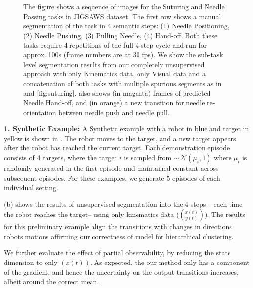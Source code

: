 \begin{figure}[!ht]
	\caption{ The figure shows a sequence of images for the Suturing and Needle Passing tasks in JIGSAWS dataset\cite{gao2014jigsaws}.
The first row shows a manual segmentation of the task in 4 semantic steps: (1) Needle Positioning, (2) Needle Pushing, (3) Pulling Needle, (4) Hand-off.
Both these tasks require 4 repetitions of the full 4 step cycle and run for approx. 100s (frame numbers are at 30 fps).
We show the sub-task level segmentation results from our completely unsupervised approach with only Kinematics data, only Visual data and a concatenation of both tasks with multiple spurious segments as in  and \ref{fig:suturing}.  also shows (in magenta) frames of predicted Needle Hand-off, and (in orange) a new transition for needle re-orientation between needle push and needle pull.
}
	\label{fig:jigsaws}
	\vspace{-15pt}
\end{figure}


\vspace{5pt}
\noindent \textbf{1. Synthetic Example: }
A Synthetic example with a robot in blue and target in yellow is shown in . The robot moves to the target, and a new target appears after the robot has reached the current target. Each demonstration episode consists of 4 targets, where the target $i$ is sampled from  $\sim\,\mathcal{N}(\mu_i, 1)$ where $\mu_i$ is randomly generated in the first episode and maintained constant across subsequent episodes. For these examples, we generate 5 episodes of each individual setting.

 (b) shows the results of unsupervised segmentation into the 4 steps -- each time the robot reaches the target-- using only kinematics data ($\binom{x(t)}{y(t)}$). The results for this preliminary example align the transitions with changes in directions robots motions affirming our correctness of model for hierarchical clustering. 

We further evaluate the effect of partial observability, by reducing the state dimension to only $(x(t))$. As expected, the our method only has a component of the gradient, and hence the uncertainty on the output transitions increases, albeit around the correct mean. 

